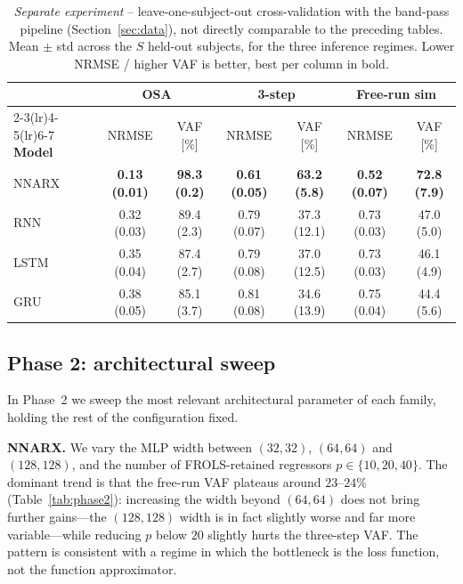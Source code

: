 \documentclass[10pt,twocolumn,letterpaper]{article}
\begin{document}
\begin{table}[t]
\centering
\caption{\emph{Separate experiment} -- leave-one-subject-out
cross-validation with the band-pass pipeline (Section~\ref{sec:data}), not
directly comparable to the preceding tables. Mean $\pm$ std across the $S$
held-out subjects, for the three inference regimes. Lower NRMSE / higher
VAF is better, best per column in bold.}
\label{tab:loso}
\setlength{\tabcolsep}{6pt}
\begin{tabular}{lcccccc}
\toprule
 & \multicolumn{2}{c}{\textbf{OSA}}
 & \multicolumn{2}{c}{\textbf{3-step}}
 & \multicolumn{2}{c}{\textbf{Free-run sim}} \\
\cmidrule(lr){2-3}\cmidrule(lr){4-5}\cmidrule(lr){6-7}
\textbf{Model} & NRMSE & VAF [\%] & NRMSE & VAF [\%] & NRMSE & VAF [\%] \\
\midrule
NNARX & \textbf{0.13 (0.01)} & \textbf{98.3 (0.2)} & \textbf{0.61 (0.05)} & \textbf{63.2 (5.8)} & \textbf{0.52 (0.07)} & \textbf{72.8 (7.9)} \\
RNN   & 0.32 (0.03) & 89.4 (2.3) & 0.79 (0.07) & 37.3 (12.1) & 0.73 (0.03) & 47.0 (5.0) \\
LSTM  & 0.35 (0.04) & 87.4 (2.7) & 0.79 (0.08) & 37.0 (12.5) & 0.73 (0.03) & 46.1 (4.9) \\
GRU   & 0.38 (0.05) & 85.1 (3.7) & 0.81 (0.08) & 34.6 (13.9) & 0.75 (0.04) & 44.4 (5.6) \\
\bottomrule
\end{tabular}
\end{table}

\subsection{Phase 2: architectural sweep}\label{sec:phase2}

In Phase~2 we sweep the most relevant architectural parameter of each
family, holding the rest of the configuration fixed.

\noindent\textbf{NNARX.} We vary the MLP width between $(32,32)$,
$(64,64)$ and $(128,128)$, and the number of FROLS-retained regressors
$p\in\{10,20,40\}$. The dominant trend is that the free-run VAF plateaus
around $23$--$24\%$ (Table~\ref{tab:phase2}): increasing the width beyond
$(64,64)$ does not bring further gains---the $(128,128)$ width is in fact
slightly worse and far more variable---while reducing $p$ below $20$
slightly hurts the three-step VAF. The pattern is consistent with a regime in which the
bottleneck is the loss function, not the function approximator.
\end{document}
